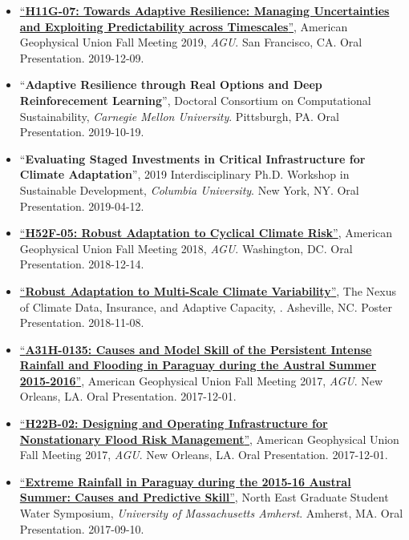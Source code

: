 \documentclass[10pt,oneside]{article}
\begin{document}
\begin{itemize}[label={}]
  \item \href{https://figshare.com/articles/Towards_Adaptive_Resilience_Managing_uncertainties_and_exploiting_predictability_across_timescales/11397936}{\enquote{\textbf{H11G-07: Towards Adaptive Resilience: Managing Uncertainties and Exploiting Predictability across Timescales}}}, American Geophysical Union Fall Meeting 2019,  \textit{AGU}. San Francisco, CA. Oral Presentation. 2019-12-09.

  \item \enquote{\textbf{Adaptive Resilience through Real Options and Deep Reinforecement Learning}}, Doctoral Consortium on Computational Sustainability,  \textit{Carnegie Mellon University}. Pittsburgh,  PA. Oral Presentation. 2019-10-19.

  \item \enquote{\textbf{Evaluating Staged Investments in Critical Infrastructure for Climate Adaptation}}, 2019 Interdisciplinary Ph.D. Workshop in Sustainable Development,  \textit{Columbia University}. New York, NY. Oral Presentation. 2019-04-12.

  \item \href{https://agu.confex.com/agu/fm18/meetingapp.cgi/Paper/440508}{\enquote{\textbf{H52F-05: Robust Adaptation to Cyclical Climate Risk}}}, American Geophysical Union Fall Meeting 2018,  \textit{AGU}. Washington, DC. Oral Presentation. 2018-12-14.

  \item \href{https://doi.org/10.6084/m9.figshare.8277002.v1}{\enquote{\textbf{Robust Adaptation to Multi-Scale Climate Variability}}}, The Nexus of Climate Data, Insurance, and Adaptive Capacity,  . Asheville, NC. Poster Presentation. 2018-11-08.

  \item \href{https://agu.confex.com/agu/fm17/meetingapp.cgi/Paper/299087}{\enquote{\textbf{A31H-0135: Causes and Model Skill of the Persistent Intense Rainfall and Flooding in Paraguay during the Austral Summer 2015-2016}}}, American Geophysical Union Fall Meeting 2017,  \textit{AGU}. New Orleans, LA. Oral Presentation. 2017-12-01.

  \item \href{https://agu.confex.com/agu/fm17/meetingapp.cgi/Paper/241469}{\enquote{\textbf{H22B-02: Designing and Operating Infrastructure for Nonstationary Flood Risk Management}}}, American Geophysical Union Fall Meeting 2017,  \textit{AGU}. New Orleans, LA. Oral Presentation. 2017-12-01.

  \item \href{https://doi.org/10.6084/m9.figshare.8277128.v2}{\enquote{\textbf{Extreme Rainfall in Paraguay during the 2015-16 Austral Summer: Causes and Predictive Skill}}}, North East Graduate Student Water Symposium,  \textit{University of Massachusetts Amherst}. Amherst, MA. Oral Presentation. 2017-09-10.


\end{itemize}
\end{document}
